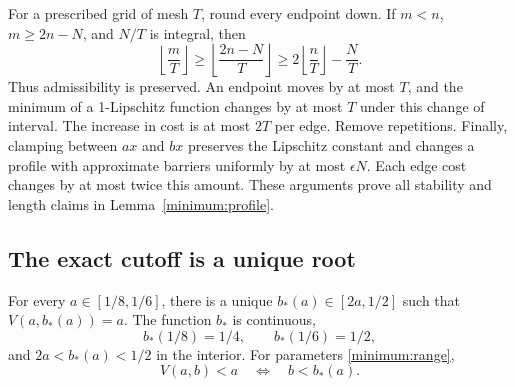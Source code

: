 For a prescribed grid of mesh \(T\), round every endpoint down. If
\(m<n\), \(m\ge2n-N\), and \(N/T\) is integral, then
\[
 \left\lfloor\frac mT\right\rfloor
 \ge \left\lfloor\frac{2n-N}{T}\right\rfloor
 \ge2\left\lfloor\frac nT\right\rfloor-\frac NT.
\]
Thus admissibility is preserved. An endpoint moves by at most \(T\),
and the minimum of a 1-Lipschitz function changes by at most \(T\)
under this change of interval. The increase in cost is at most \(2T\)
per edge. Remove repetitions. Finally, clamping between \(ax\) and
\(bx\) preserves the Lipschitz constant and changes a profile with
approximate barriers uniformly by at most \(\epsilon N\). Each edge
cost changes by at most twice this amount. These arguments prove all
stability and length claims in Lemma~\ref{minimum:profile}.

\subsection{The exact cutoff is a unique root}
\begin{proposition}\label{minimum:root}
For every \(a\in[1/8,1/6]\), there is a unique
\(b_*(a)\in[2a,1/2]\) such that \(V(a,b_*(a))=a\).
The function \(b_*\) is continuous,
\[
 b_*(1/8)=1/4,\qquad b_*(1/6)=1/2,
\]
and \(2a<b_*(a)<1/2\) in the interior. For parameters
\eqref{minimum:range},
\[
 V(a,b)<a\quad\Longleftrightarrow\quad b<b_*(a).
\]
\end{proposition}

